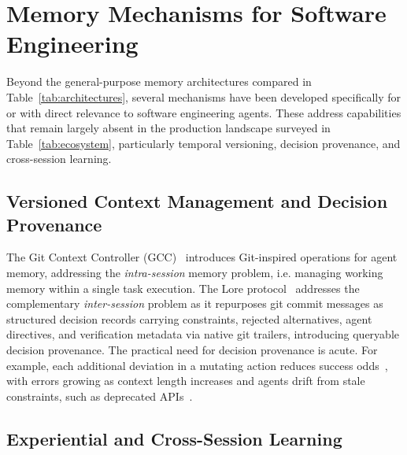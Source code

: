 \documentclass[runningheads]{llncs}
\begin{document}
\section{Memory Mechanisms for Software Engineering}\label{sec:semechanisms}

Beyond the general-purpose memory architectures compared in Table~\ref{tab:architectures}, several mechanisms have
been developed specifically for or with direct relevance to software engineering agents. These address capabilities that remain largely absent in the production landscape surveyed in Table~\ref{tab:ecosystem}, particularly temporal versioning, decision provenance, and cross-session learning.

\subsection{Versioned Context Management and Decision Provenance}

The Git Context Controller (GCC)~\cite{gcc2025} introduces Git-inspired
operations for agent memory, addressing the \emph{intra-session} memory
problem, i.e. managing working memory within a single task execution. The Lore protocol~\cite{lore2026} addresses the complementary
\emph{inter-session} problem as it repurposes git commit messages as
structured decision records carrying constraints, rejected alternatives,
agent directives, and verification metadata via native git trailers, introducing queryable decision provenance.
The practical need for decision provenance is acute. For example, each additional deviation in a
mutating action reduces success odds~\cite{saber2026}, with errors growing
as context length increases and agents drift from stale constraints, such as deprecated APIs~\cite{wang2025deprecated,ashik2026}.

\subsection{Experiential and Cross-Session Learning}
\end{document}
